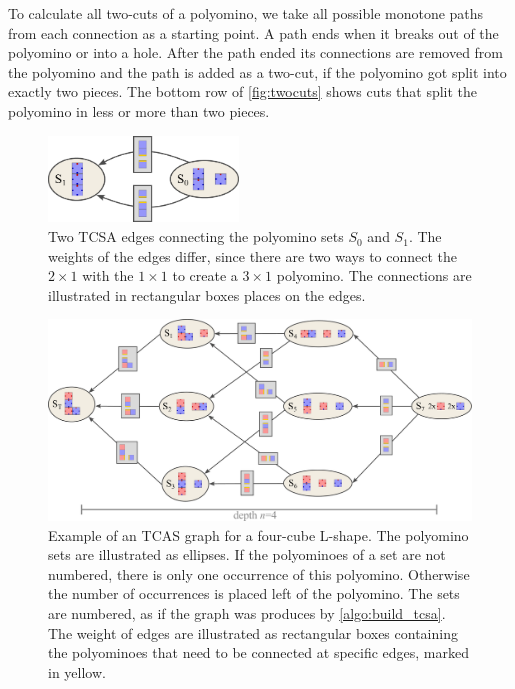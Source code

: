 To calculate all two-cuts of a polyomino, we take all possible monotone paths from each connection as a starting point.
A path ends when it breaks out of the polyomino or into a hole.
After the path ended its connections are removed from the polyomino and the path is added as a two-cut, if the polyomino got split into exactly two pieces.
The bottom row of \autoref{fig:twocuts} shows cuts that split the polyomino in less or more than two pieces.


\begin{figure}
	\centering
	\includegraphics[width=0.45\textwidth]{figures/tcsa_multiedge.pdf}
	\caption[Two TCSA nodes connected with multiple edges.]{Two TCSA edges connecting the polyomino sets $S_0$ and $S_1$. The weights of the edges differ, since there are two ways to connect the $2\times1$ with the $1\times1$ to create a $3\times1$ polyomino. The connections are illustrated in rectangular boxes places on the edges.}
	\label{fig:tcsa_multiedge}
\end{figure}

\begin{figure}
	\centering
	\includegraphics[width=1\textwidth]{figures/tcsa.pdf}
	\caption[Example for a two-cut-sub-assembly graph.]{Example of an TCAS graph for a four-cube L-shape. The polyomino sets are illustrated as ellipses. If the polyominoes of a set are not numbered, there is only one occurrence of this polyomino. Otherwise the number of occurrences is placed left of the polyomino. The sets are numbered, as if the graph was produces by \autoref{algo:build_tcsa}. The weight of edges are illustrated as rectangular boxes containing the polyominoes that need to be connected at specific edges, marked in yellow.}
	\label{fig:tcsa}
\end{figure}

